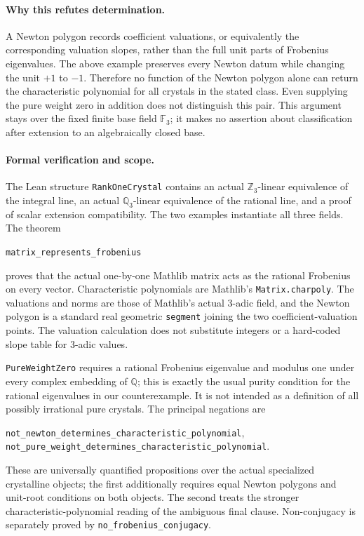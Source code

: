 \documentclass[11pt]{article}
\begin{document}
\paragraph{Why this refutes determination.}
A Newton polygon records coefficient valuations, or equivalently
the corresponding valuation slopes, rather than the full unit
parts of Frobenius eigenvalues. The above example preserves every
Newton datum while changing the unit $+1$ to $-1$. Therefore no
function of the Newton polygon alone can return the characteristic
polynomial for all crystals in the stated class. Even supplying
the pure weight zero in addition does not distinguish this pair.
This argument stays over the fixed finite base field
$\mathbb F_3$; it makes no assertion about classification after
extension to an algebraically closed base.

\paragraph{Formal verification and scope.}
The Lean structure \texttt{RankOneCrystal} contains an actual
$\mathbb Z_3$-linear equivalence of the integral line, an actual
$\mathbb Q_3$-linear equivalence of the rational line, and a proof
of scalar extension compatibility. The two examples instantiate
all three fields. The theorem
\begin{center}\texttt{matrix\_represents\_frobenius}\end{center}
proves that the actual one-by-one Mathlib matrix acts as the
rational Frobenius on every vector. Characteristic polynomials
are Mathlib's \texttt{Matrix.charpoly}. The valuations and norms
are those of Mathlib's actual $3$-adic field, and the Newton
polygon is a standard real geometric \texttt{segment} joining
the two coefficient-valuation points. The valuation calculation
does not substitute integers or a hard-coded slope table for
$3$-adic values.

\texttt{PureWeightZero} requires a rational Frobenius eigenvalue
and modulus one under every complex embedding of $\mathbb Q$;
this is exactly the usual purity condition for the rational
eigenvalues in our counterexample. It is not intended as a
definition of all possibly irrational pure crystals.
The principal negations are
\begin{center}
\texttt{not\_newton\_determines\_characteristic\_polynomial},\\
\texttt{not\_pure\_weight\_determines\_characteristic\_polynomial}.
\end{center}
These are universally quantified propositions over the actual
specialized crystalline objects; the first additionally requires
equal Newton polygons and unit-root conditions on both objects.
The second treats the stronger characteristic-polynomial reading
of the ambiguous final clause. Non-conjugacy is separately proved
by \texttt{no\_frobenius\_conjugacy}.
\end{document}
